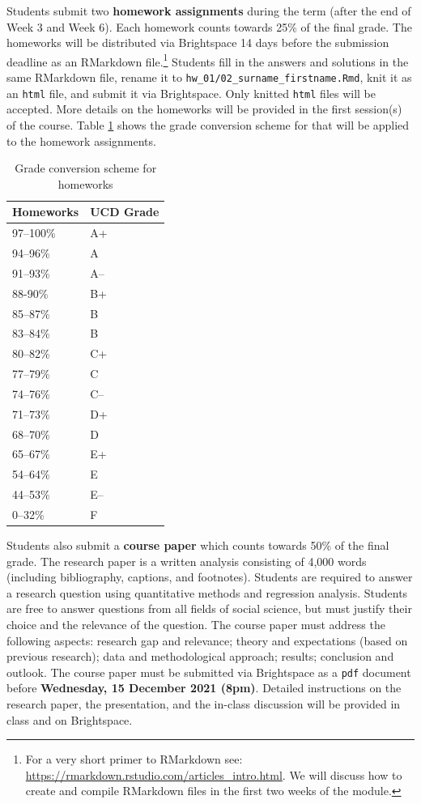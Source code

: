 \documentclass[abstract=on,parskip=full,headings=standardclasses,fontsize=11pt,paper=a4]{scrartcl}
\begin{document}
Students submit two \textbf{homework assignments} during the term (after the end of Week 3 and Week 6). Each homework counts towards 25\% of the final grade.  The homeworks will be distributed via Brightspace 14 days before the submission deadline as an RMarkdown file.\footnote{For a very short primer to RMarkdown see: \url{https://rmarkdown.rstudio.com/articles_intro.html}. We will discuss how to create and compile RMarkdown files in the first two weeks of the module.} Students fill in the answers and solutions in the same RMarkdown file, rename it to \texttt{hw\_01/02\_surname\_firstname.Rmd}, knit it as an \texttt{html} file, and submit it via Brightspace. Only knitted \texttt{html} files will be accepted. More details on the homeworks will be provided in the first session(s) of the course. Table \ref{tab:homework} shows the grade conversion scheme for that will be applied to the homework assignments.



\begin{table}[h] \centering \singlespacing \footnotesize
\caption{Grade conversion scheme for homeworks} 
\label{tab:homework}
\begin{tabular}{ l l}  
\toprule
Homeworks &  UCD Grade \\
\midrule
97--100\% & A+ \\
94--96\% & A \\
91--93\% & A-- \\
88-90\% & B+ \\
85--87\% & B \\
83--84\% & B \\
80--82\% & C+ \\
77--79\% & C \\
74--76\% & C-- \\
71--73\% & D+ \\
68--70\% & D \\
65--67\% & E+ \\
54--64\% & E \\
44--53\% & E--\\
0--32\% & F\\
\bottomrule
\end{tabular}
\end{table}



Students also submit a \textbf{course paper} which counts towards 50\% of the final grade. The research paper is a written analysis consisting of 4,000 words (including bibliography, captions, and footnotes). Students are required to  answer a research question using quantitative methods and regression analysis. Students are free to answer questions from all fields of social science, but must justify their choice and the relevance of the question. The course paper must address the following aspects: research gap and relevance; theory and expectations (based on previous research); data and methodological approach; results; conclusion and outlook. The course paper must be submitted via Brightspace as a \texttt{pdf} document before \textbf{Wednesday, 15 December 2021 (8pm)}.  Detailed instructions on the research paper, the presentation, and the in-class discussion will be provided in class and on Brightspace.
\end{document}
